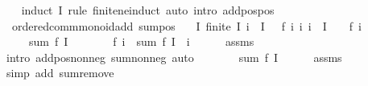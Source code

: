 \begin{isabellebody}
%
\isadelimproof
\ \ %
\endisadelimproof
%
\isatagproof
{}\isamarkupfalse%
\ {\isacharparenleft}{\kern0pt}induct\ I\ rule{\isacharcolon}{\kern0pt}\ finite{\isacharunderscore}{\kern0pt}ne{\isacharunderscore}{\kern0pt}induct{\isacharparenright}{\kern0pt}\ {\isacharparenleft}{\kern0pt}auto\ intro{\isacharcolon}{\kern0pt}\ add{\isacharunderscore}{\kern0pt}pos{\isacharunderscore}{\kern0pt}pos{\isacharparenright}{\kern0pt}%
\endisatagproof
{\isafoldproof}%
%
\isadelimproof
\isanewline
%
\endisadelimproof
\isanewline
{}\isamarkupfalse%
\ {\isacharparenleft}{\kern0pt}\ ordered{\isacharunderscore}{\kern0pt}comm{\isacharunderscore}{\kern0pt}monoid{\isacharunderscore}{\kern0pt}add{\isacharparenright}{\kern0pt}\ sum{\isacharunderscore}{\kern0pt}pos{}{\isacharcolon}{\kern0pt}\isanewline
\ \ \ I{\isacharcolon}{\kern0pt}\ {\isachardoublequoteopen}finite\ I{\isachardoublequoteclose}\ {\isachardoublequoteopen}i\ {\isasymin}\ I{\isachardoublequoteclose}\ {\isachardoublequoteopen}{}\ {\isacharless}{\kern0pt}\ f\ i{\isachardoublequoteclose}\ {\isachardoublequoteopen}{\isasymAnd}i{\isachardot}{\kern0pt}\ i\ {\isasymin}\ I\ {\isasymLongrightarrow}\ {}\ {\isasymle}\ f\ i{\isachardoublequoteclose}\isanewline
\ \ \ {\isachardoublequoteopen}{}\ {\isacharless}{\kern0pt}\ sum\ f\ I{\isachardoublequoteclose}\isanewline
%
\isadelimproof
%
\endisadelimproof
%
\isatagproof
{}\isamarkupfalse%
\ {\isacharminus}{\kern0pt}\isanewline
\ \ \isamarkupfalse%
\ {\isachardoublequoteopen}{}\ {\isacharless}{\kern0pt}\ f\ i\ {\isacharplus}{\kern0pt}\ sum\ f\ {\isacharparenleft}{\kern0pt}I\ {\isacharminus}{\kern0pt}\ {\isacharbraceleft}{\kern0pt}i{\isacharbraceright}{\kern0pt}{\isacharparenright}{\kern0pt}{\isachardoublequoteclose}\isanewline
\ \ \ \ \isamarkupfalse%
\ assms\ \isamarkupfalse%
\ {\isacharparenleft}{\kern0pt}intro\ add{\isacharunderscore}{\kern0pt}pos{\isacharunderscore}{\kern0pt}nonneg\ sum{\isacharunderscore}{\kern0pt}nonneg{\isacharparenright}{\kern0pt}\ auto\isanewline
\ \ \isamarkupfalse%
\ \isamarkupfalse%
\ {\isachardoublequoteopen}{\isasymdots}\ {\isacharequal}{\kern0pt}\ sum\ f\ I{\isachardoublequoteclose}\isanewline
\ \ \ \ \isamarkupfalse%
\ assms\ \isamarkupfalse%
\ {\isacharparenleft}{\kern0pt}simp\ add{\isacharcolon}{\kern0pt}\ sum{\isachardot}{\kern0pt}remove{\isacharparenright}{\kern0pt}\isanewline

\end{isabellebody}
